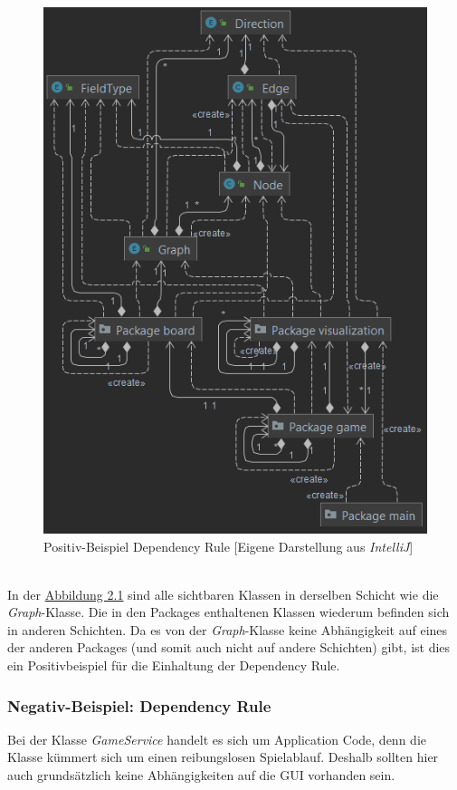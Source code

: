 \newpage
\noindent
\begin{figure}[htbp]
\centering
\centerline{\includegraphics[scale=.5]{dependencyrule_klasse_graph}}
\caption{Positiv-Beispiel Dependency Rule [Eigene Darstellung aus \emph{IntelliJ}]}
\label{fig:dependencyrulepositiv}
\end{figure}
\\
\noindent In der \hyperref[fig:dependencyrulepositiv]{Abbildung 2.1} sind alle sichtbaren Klassen in derselben Schicht wie die \emph{Graph}-Klasse. Die in den Packages enthaltenen Klassen wiederum befinden sich in anderen Schichten. Da es von der \emph{Graph}-Klasse keine Abhängigkeit auf eines der anderen Packages (und somit auch nicht auf andere Schichten) gibt, ist dies ein Positivbeispiel für die Einhaltung der Dependency Rule.

\newpage
\noindent

\subsubsection{Negativ-Beispiel: Dependency Rule}
\noindent Bei der Klasse \emph{GameService} handelt es sich um Application Code, denn die Klasse kümmert sich um einen reibungslosen Spielablauf. Deshalb sollten hier auch grundsätzlich keine Abhängigkeiten auf die GUI vorhanden sein.

